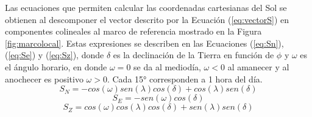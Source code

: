 %
%
%
%
Las ecuaciones que permiten calcular las coordenadas cartesianas del Sol se obtienen al descomponer el vector descrito por la Ecuación (\ref{eq:vectorS}) en componentes colineales al marco de referencia mostrado en la Figura \ref{fig:marcolocal}. Estas expresiones se describen en las Ecuaciones (\ref{eq:Sn}), (\ref{eq:Se}) y (\ref{eq:Sz}), donde $ \delta $ es la declinación de la Tierra en función de $ \phi $ y $ \omega $ es el ángulo horario, en donde $ \omega = 0 $ se da al mediodía, $ \omega < 0 $ al amanecer y al anochecer es positivo $ \omega > 0 $. Cada 15° corresponden a 1 hora del día.
\begin{equation}\label{eq:Sn}
S_{N}=-cos(\omega)sen(\lambda)cos(\delta)+cos(\lambda)sen(\delta)
\end{equation}
\begin{equation}\label{eq:Se}
S_{E}=-sen(\omega)cos(\delta)
\end{equation}
\begin{equation}\label{eq:Sz}
S_{Z}=cos(\omega)cos(\lambda)cos(\delta)+sen(\lambda)sen(\delta)
\end{equation}
%
%
%

